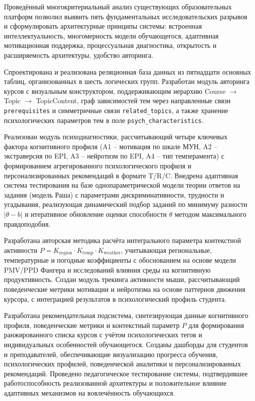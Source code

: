 \documentclass[a4paper,12pt]{article}
\begin{document}
Проведённый многокритериальный анализ существующих образовательных платформ позволил выявить пять фундаментальных исследовательских разрывов и сформулировать архитектурные принципы системы: встроенная интеллектуальность, многомерность модели обучающегося, адаптивная мотивационная поддержка, процессуальная диагностика, открытость и расширяемость архитектуры, удобство авторинга.

Спроектирована и реализована реляционная база данных из пятнадцати основных таблиц, организованных в шесть логических групп. Разработан модуль авторинга курсов с визуальным конструктором, поддерживающим иерархию Course $\to$ Topic $\to$ TopicContent, граф зависимостей тем через направленные связи \texttt{prerequisites} и симметричные связи \texttt{related\_topics}, а также хранение психологических параметров тем в поле \texttt{psych\_characteristics}.

Реализован модуль психодиагностики, рассчитывающий четыре ключевых фактора когнитивного профиля (A1 -- мотивация по шкале МУН, A2 -- экстраверсия по EPI, A3 -- нейротизм по EPI, A4 -- тип темперамента) с формированием агрегированного психологического профиля и персонализированных рекомендаций в формате T/R/C. Внедрена адаптивная система тестирования на базе однопараметрической модели теории ответов на задания (модель Раша) с параметрами дискриминативности, трудности и угадывания, реализующая динамический подбор заданий по минимуму разности $|\theta - b|$ и итеративное обновление оценки способности $\theta$ методом максимального правдоподобия.

Разработана авторская методика расчёта интегрального параметра контекстной активности $P = K_{\text{region}} \cdot K_{\text{temp}} \cdot K_{\text{weather}}$, учитывающая региональные, температурные и погодные коэффициенты с обоснованием на основе модели PMV/PPD Фангера и исследований влияния среды на когнитивную продуктивность. Создан модуль трекинга активности мыши, рассчитывающий поведенческие метрики мотивации и нейротизма на основе паттернов движения курсора, с интеграцией результатов в психологический профиль студента.

Разработана рекомендательная подсистема, синтезирующая данные когнитивного профиля, поведенческие метрики и контекстный параметр $P$ для формирования ранжированного списка курсов с учётом психологических тегов и индивидуальных особенностей обучающегося. Созданы дашборды для студентов и преподавателей, обеспечивающие визуализацию прогресса обучения, психологических профилей, поведенческой аналитики и персонализированных рекомендаций. Проведено педагогическое тестирование системы, подтвердившее работоспособность реализованной архитектуры и положительное влияние адаптивных механизмов на вовлечённость обучающихся.
\end{document}
